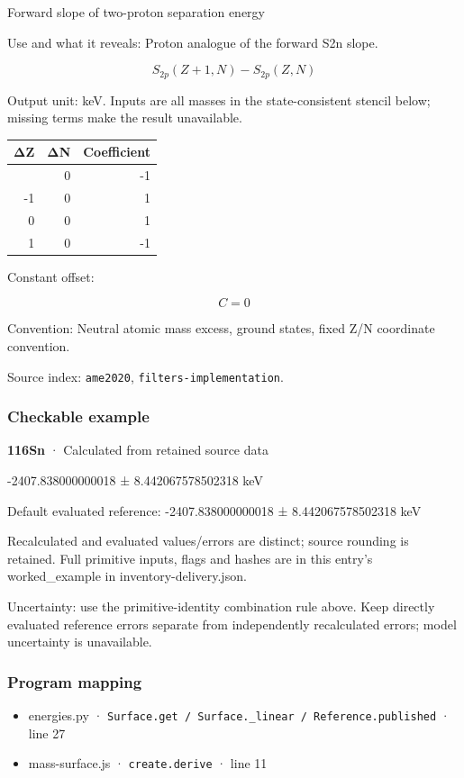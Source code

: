 \documentclass[
  11pt,
  letterpaper,
]{article}
\providecommand{\tightlist}{%
  \setlength{\itemsep}{0pt}\setlength{\parskip}{0pt}}
\begin{document}
Forward slope of two-proton separation energy

Use and what it reveals: Proton analogue of the forward S2n slope.

\[
S_{2p}(Z+1,N)-S_{2p}(Z,N)
\]

Output unit: keV. Inputs are all masses in the state-consistent stencil
below; missing terms make the result unavailable.

\begin{longtable}[]{@{}rrr@{}}
\toprule\noalign{}
ΔZ & ΔN & Coefficient \\
\midrule\noalign{}
\endhead
\bottomrule\noalign{}
\endlastfoot
-2 & 0 & -1 \\
-1 & 0 & 1 \\
0 & 0 & 1 \\
1 & 0 & -1 \\
\end{longtable}

Constant offset:

\[
C=0
\]

Convention: Neutral atomic mass excess, ground states, fixed Z/N
coordinate convention.

Source index: \texttt{ame2020}, \texttt{filters-implementation}.

\subsubsection{Checkable example}\label{checkable-example-31}

\textbf{116Sn} · Calculated from retained source data

-2407.838000000018 ± 8.442067578502318 keV

Default evaluated reference: -2407.838000000018 ± 8.442067578502318 keV

Recalculated and evaluated values/errors are distinct; source rounding
is retained. Full primitive inputs, flags and hashes are in this entry's
worked\_example in inventory-delivery.json.

Uncertainty: use the primitive-identity combination rule above. Keep
directly evaluated reference errors separate from independently
recalculated errors; model uncertainty is unavailable.

\subsubsection{Program mapping}\label{program-mapping-31}

\begin{itemize}
\tightlist
\item
  energies.py ·
  \texttt{Surface.get\ /\ Surface.\_linear\ /\ Reference.published} ·
  line 27
\item
  mass-surface.js · \texttt{create.derive} · line 11
\end{itemize}
\end{document}
